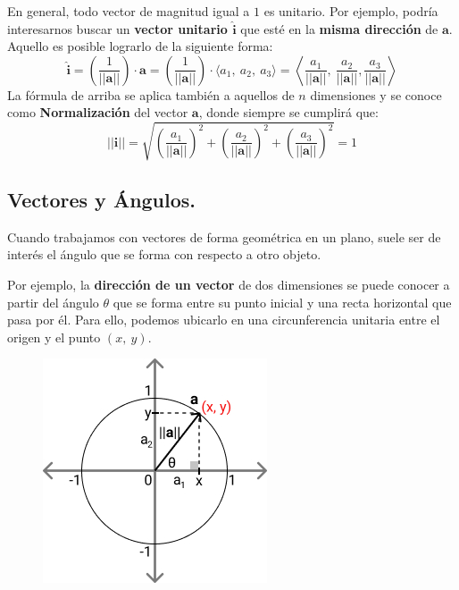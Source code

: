 \documentclass[12pt]{article}
\begin{document}
En general, todo vector de magnitud igual a $1$ es unitario. Por ejemplo, podría interesarnos buscar un \textbf{vector unitario $\hat{\mathbf{i}}$} que esté en la \textbf{misma dirección} de $\mathbf{a}$. Aquello es posible lograrlo de la siguiente forma:
\[
  \hat{\mathbf{i}} = \left(\frac{1}{||\mathbf{a}||}\right) \cdot \mathbf{a}
                   = \left(\frac{1}{||\mathbf{a}||}\right) \cdot \langle a_{1}, \ a_{2}, \ a_{3} \rangle
                   = \left\langle \frac{a_{1}}{||\mathbf{a}||}, \ \frac{a_{2}}{||\mathbf{a}||}, \frac{a_{3}}{||\mathbf{a}||} \right\rangle
\]
La fórmula de arriba se aplica también a aquellos de $n$ dimensiones y se conoce como \textbf{Normalización} del vector $\mathbf{a}$, donde siempre se cumplirá que:
\[
  ||\hat{\mathbf{i}}|| = \sqrt{
                                \left(\frac{a_{1}}{||\mathbf{a}||}\right)^{2} +
                                \left(\frac{a_{2}}{||\mathbf{a}||}\right)^{2} +
                                \left(\frac{a_{3}}{||\mathbf{a}||}\right)^{2}
                              }
                       = 1
\]

\subsection{Vectores y Ángulos.}

Cuando trabajamos con vectores de forma geométrica en un plano, suele ser de interés el ángulo que se forma con respecto a otro objeto.

Por ejemplo, la \textbf{dirección de un vector} de dos dimensiones se puede conocer a partir del ángulo $\theta$ que se forma entre su punto inicial y una recta horizontal que pasa por él. Para ello, podemos ubicarlo en una circunferencia unitaria entre el origen y el punto $(x, \ y)$.


\begin{figure}[hbt!]
\centering
\includegraphics[scale=0.6]{img/direction-vector-1.jpg}
\end{figure}
\end{document}
